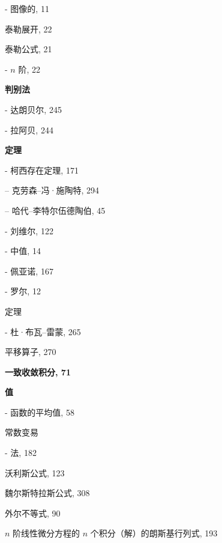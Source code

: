- 图像的, 11

泰勒展开, 22

泰勒公式, 21

- \(n\) 阶, 22

\par\noindent\textbf{判别法}\par

- 达朗贝尔, 245

- 拉阿贝, 244

\par\noindent\textbf{定理}\par

- 柯西存在定理, 171

-- 克劳森–冯·施陶特, 294

-- 哈代–李特尔伍德陶伯, 45

- 刘维尔, 122

- 中值, 14

- 佩亚诺, 167

- 罗尔, 12

定理

- 杜·布瓦–雷蒙, 265

平移算子, 270

\par\noindent\textbf{一致收敛积分, 71}\par

\par\noindent\textbf{值}\par

- 函数的平均值, 58

常数变易

- 法, 182

沃利斯公式, 123

魏尔斯特拉斯公式, 308

外尔不等式, 90

\(n\) 阶线性微分方程的 \(n\) 个积分（解）的朗斯基行列式, 193
